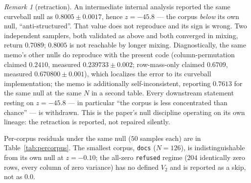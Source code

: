 \documentclass[11pt,a4paper]{article}
\theoremstyle{plain}
\theoremstyle{remark}
\newtheorem{remark}{Remark}
\theoremstyle{plain}
\begin{document}
\begin{remark}[retraction]
\label{rem:retraction}
An intermediate internal analysis reported the same curveball null as $0.8005\pm0.0017$, hence $z=-45.8$ --- the corpus \emph{below} its own null, ``anti-structured''. That value does not reproduce and its sign is wrong. Two independent samplers, both validated as above and both converged in mixing, return $0.7089$; $0.8005$ is not reachable by longer mixing. Diagnostically, the same memo's other nulls do reproduce with the present code (column-permutation claimed $0.2410$, measured $0.239733\pm0.002$; row-mass-only claimed $0.6709$, measured $0.670800\pm0.001$), which localizes the error to its curveball implementation; the memo is additionally self-inconsistent, reporting $0.7613$ for the same null at the same $N$ in a second table. Every downstream statement resting on $z=-45.8$ --- in particular ``the corpus is less concentrated than chance'' --- is withdrawn. This is the paper's null discipline operating on its own lineage: the retraction is reported, not repaired silently.
\end{remark}

Per-corpus residuals under the same null ($50$ samples each) are in Table~\ref{tab:percorpus}. The smallest corpus, \texttt{docs} ($N=126$), is indistinguishable from its own null at $z=-0.10$; the all-zero \texttt{refused} regime ($204$ identically zero rows, every column of zero variance) has no defined $V_2$ and is reported as a skip, not as $0.0$.
\end{document}
